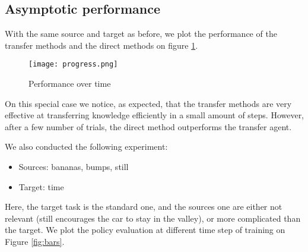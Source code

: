 \documentclass{article}
\begin{document}
\subsection{Asymptotic performance}

With the same source and target as before, we plot the performance of the transfer methods and the direct methods on figure \ref{fig:progress}.

\begin{figure}
\centering
\texttt{[image: progress.png]}
\caption{Performance over time}
\label{fig:progress}
\end{figure}

On this special case we notice, as expected, that the transfer methods are very effective at transferring knowledge efficiently in a small amount of steps. However, after a few number of trials, the direct method outperforms the transfer agent.




We also conducted the following experiment:
\begin{itemize}
\item Sources: bananas, bumps, still
\item Target: time
\end{itemize}

Here, the target task is the standard one, and the sources one are either not relevant (still encourages the car to stay in the valley), or more complicated than the target. We plot the policy  evaluation at different time step of training on Figure \ref{fig:bars}.
\end{document}
